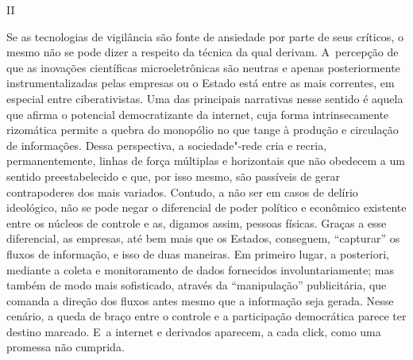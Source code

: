 \begin{center}
II
\end{center}

Se as tecnologias de vigilância são fonte de ansiedade por parte de seus
críticos, o mesmo não se pode dizer a respeito da técnica da qual
derivam. A~percepção de que as inovações científicas microeletrônicas
são neutras e apenas posteriormente instrumentalizadas pelas empresas ou
o Estado está entre as mais correntes, em especial entre ciberativistas.
Uma das principais narrativas nesse sentido é aquela que afirma o
potencial democratizante da internet, cuja forma intrinsecamente
rizomática permite a quebra do monopólio no que tange à produção e
circulação de informações. Dessa perspectiva, a sociedade"-rede cria e
recria, permanentemente, linhas de força múltiplas e horizontais que não
obedecem a um sentido preestabelecido e que, por isso mesmo, são
passíveis de gerar contrapoderes dos mais variados. Contudo, a não ser
em casos de delírio ideológico, não se pode negar o diferencial de poder
político e econômico existente entre os núcleos de controle e as,
digamos assim, pessoas físicas. Graças a esse diferencial, as empresas,
até bem mais que os Estados, conseguem, ``capturar'' os fluxos de
informação, e isso de duas maneiras. Em primeiro lugar, a posteriori,
mediante a coleta e monitoramento de dados fornecidos involuntariamente;
mas também de modo mais sofisticado, através da ``manipulação''
publicitária, que comanda a direção dos fluxos antes mesmo que a
informação seja gerada. Nesse cenário, a queda de braço entre o controle
e a participação democrática parece ter destino marcado. E~a internet e
derivados aparecem, a cada click, como uma promessa não cumprida. ~~

